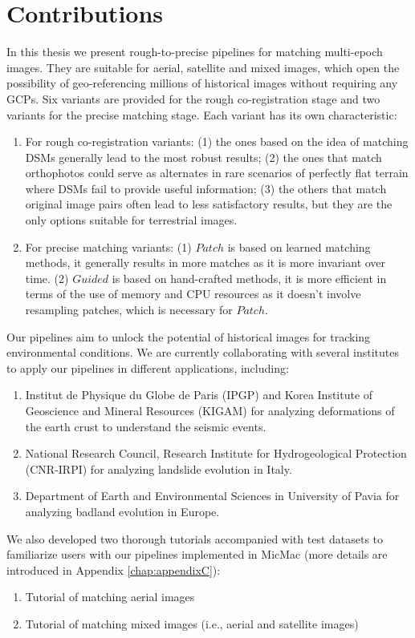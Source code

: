 \section{Contributions}
\label{sec:contributions}
In this thesis we present rough-to-precise pipelines for matching multi-epoch images. They are suitable for aerial, satellite and mixed images, which open the possibility of geo-referencing millions of historical images without requiring any \ac{GCP}s. 
Six variants are provided for the rough co-registration stage and two variants for the precise matching stage. Each variant has its own characteristic:\\
\begin{enumerate}
	\item For rough co-registration variants: (1) the ones based on the idea of matching \ac{DSM}s generally lead to the most robust results; (2) the ones that match orthophotos could serve as alternates in rare scenarios of perfectly flat terrain where \ac{DSM}s fail to provide useful information; (3) the others that match original image pairs often lead to less satisfactory results, but they are the only options suitable for terrestrial images.
	\item For precise matching variants: (1) $Patch$ is based on learned matching methods, it generally results in more matches as it is more invariant over time. (2) $Guided$ is based on hand-crafted methods, it is more efficient in terms of the use of memory and CPU resources as it doesn't involve resampling patches, which is necessary for $Patch$. 
\end{enumerate}
\par
Our pipelines aim to unlock the potential of historical images for tracking environmental conditions. 
We are currently collaborating with several institutes to apply our pipelines in different applications, including:
\begin{enumerate}
	\item Institut de Physique du Globe de Paris (IPGP) and Korea Institute of Geoscience and Mineral Resources (KIGAM) for analyzing deformations of the earth crust to understand the seismic events.
	\item National Research Council, Research Institute for Hydrogeological Protection (CNR-IRPI) for analyzing landslide evolution in Italy.
	\item Department of Earth and Environmental Sciences in University of Pavia for analyzing badland evolution in Europe.
\end{enumerate}
\par
We also developed two thorough tutorials accompanied with test datasets to familiarize users with our pipelines implemented in MicMac\cite{HistoPcode} (more details are introduced in Appendix \ref{chap:appendixC}):
\begin{enumerate}
	\item Tutorial of matching aerial images \cite{tuto-aerial} 
	\item Tutorial of matching mixed images (i.e., aerial and satellite images) \cite{tuto-mixed} 
\end{enumerate}


